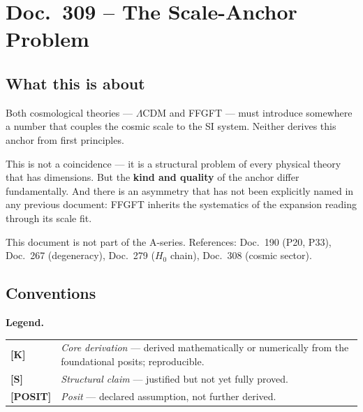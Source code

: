 \maketitle
\tableofcontents

\chapter*{Doc.~309 -- The Scale-Anchor Problem}

\section*{What this is about}

Both cosmological theories — $\Lambda$CDM and FFGFT — must introduce
somewhere a number that couples the cosmic scale to the SI system.
Neither derives this anchor from first principles.

This is not a coincidence — it is a structural problem of every physical
theory that has dimensions. But the \textbf{kind and quality} of the
anchor differ fundamentally. And there is an asymmetry that has not been
explicitly named in any previous document: FFGFT inherits the systematics
of the expansion reading through its scale fit.

This document is not part of the A-series.
References: Doc.~190 (P20, P33), Doc.~267 (degeneracy),
Doc.~279 ($H_0$ chain), Doc.~308 (cosmic sector).

\section*{Conventions}

\noindent\textbf{Legend.}

\medskip
\begin{tabular}{@{}lp{11cm}}
\textbf{[K]}      & \emph{Core derivation} — derived mathematically or
                    numerically from the foundational posits; reproducible. \\[4pt]
\textbf{[S]}      & \emph{Structural claim} — justified but not yet fully
                    proved. \\[4pt]
\textbf{[POSIT]}  & \emph{Posit} — declared assumption, not further derived. \\
\end{tabular}

